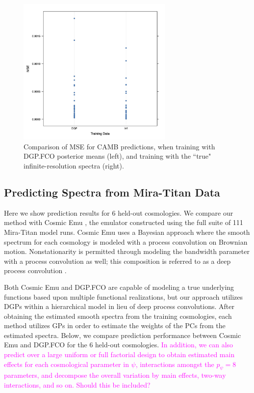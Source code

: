 \documentclass[11pt]{article}
\begin{document}
\begin{figure}
    \centering
    \includegraphics[width=3in]{mse_dot.jpg}
    \caption{Comparison of MSE for CAMB predictions, when training with DGP.FCO posterior 
             means (left), and training with the ``true" infinite-resolution spectra (right).}   
    \label{fig:mse_camb}
\end{figure}

\subsection{Predicting Spectra from Mira-Titan Data}
\label{subsec:mira_pred}

Here we show prediction results for 6 held-out cosmologies. We compare our method 
with Cosmic Emu \citep{moran2023mira}, the emulator constructed using the full suite 
of 111 Mira-Titan model runs. Cosmic Emu uses a Bayesian approach where the smooth 
spectrum for each cosmology is modeled with a process convolution on Brownian motion. 
Nonstationarity is permitted through modeling the bandwidth parameter with a process 
convolution as well; this composition is referred to as a deep process convolution 
\citep{moran2024dpc}.

Both Cosmic Emu and DGP.FCO are capable of modeling a true underlying functions based 
upon multiple functional realizations, but our approach utilizes DGPs within a 
hierarchical model in lieu of deep process convolutions. After obtaining the estimated 
smooth spectra from the training cosmologies, each method utilizes GPs in order to 
estimate the weights of the PCs from the estimated spectra. Below, we compare prediction 
performance between Cosmic Emu and DGP.FCO for the 6 held-out cosmologies. 
\textcolor{magenta}{In addition, we can also predict over a large uniform or full 
factorial design to obtain estimated main effects for each cosmological parameter in 
$\psi$, interactions amongst the $p_\psi=8$ parameters, and decompose the overall 
variation by main effects, two-way interactions, and so on. Should this be included?}
\end{document}
